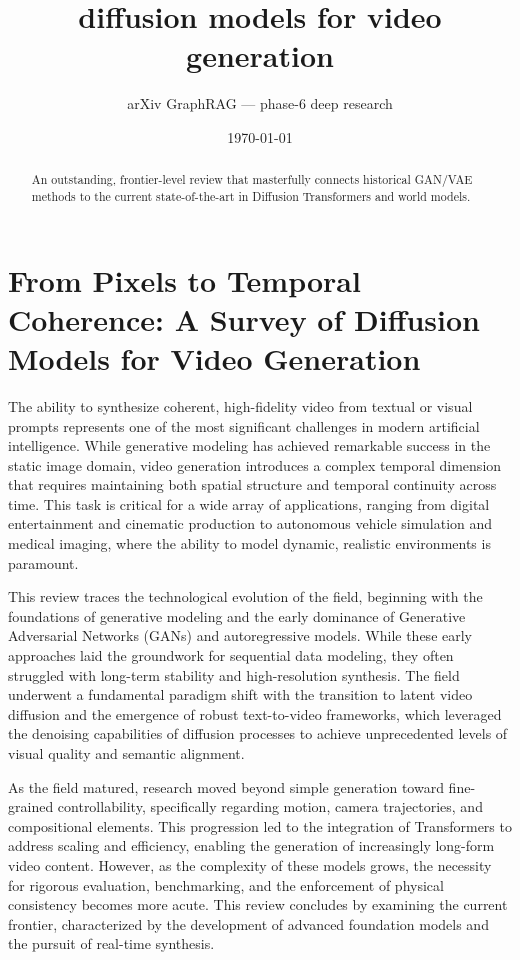 \documentclass[11pt]{article}
\title{diffusion models for video generation}
\author{arXiv GraphRAG --- phase-6 deep research}
\date{\today}
\begin{document}
\maketitle

\begin{abstract}
An outstanding, frontier-level review that masterfully connects historical GAN/VAE methods to the current state-of-the-art in Diffusion Transformers and world models.
\end{abstract}

\section{From Pixels to Temporal Coherence: A Survey of Diffusion Models for Video Generation}

The ability to synthesize coherent, high-fidelity video from textual or visual prompts represents one of the most significant challenges in modern artificial intelligence. While generative modeling has achieved remarkable success in the static image domain, video generation introduces a complex temporal dimension that requires maintaining both spatial structure and temporal continuity across time. This task is critical for a wide array of applications, ranging from digital entertainment and cinematic production to autonomous vehicle simulation and medical imaging, where the ability to model dynamic, realistic environments is paramount.

This review traces the technological evolution of the field, beginning with the foundations of generative modeling and the early dominance of Generative Adversarial Networks (GANs) and autoregressive models. While these early approaches laid the groundwork for sequential data modeling, they often struggled with long-term stability and high-resolution synthesis. The field underwent a fundamental paradigm shift with the transition to latent video diffusion and the emergence of robust text-to-video frameworks, which leveraged the denoising capabilities of diffusion processes to achieve unprecedented levels of visual quality and semantic alignment.

As the field matured, research moved beyond simple generation toward fine-grained controllability, specifically regarding motion, camera trajectories, and compositional elements. This progression led to the integration of Transformers to address scaling and efficiency, enabling the generation of increasingly long-form video content. However, as the complexity of these models grows, the necessity for rigorous evaluation, benchmarking, and the enforcement of physical consistency becomes more acute. This review concludes by examining the current frontier, characterized by the development of advanced foundation models and the pursuit of real-time synthesis.
\end{document}
